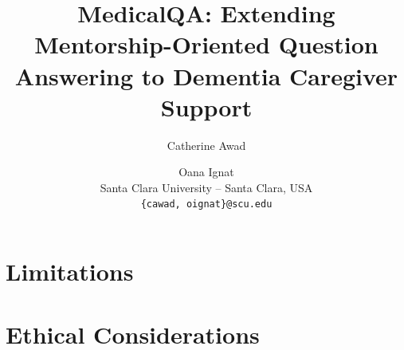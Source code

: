 \documentclass[11pt]{article}
\title{MedicalQA: Extending Mentorship-Oriented Question Answering to Dementia Caregiver Support}
\author{Catherine Awad \and Oana Ignat \\
  Santa Clara University -- Santa Clara, USA \\
  \texttt{\{cawad, oignat\}@scu.edu}}
\begin{document}
\maketitle

\begin{abstract}

\end{abstract}








\section*{Limitations}


\section*{Ethical Considerations}


\end{document}
